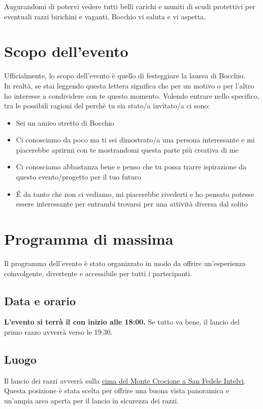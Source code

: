 \documentclass[12pt, a4paper]{article}
\begin{document}
Augurandomi di potervi vedere tutti belli carichi e muniti di scudi protettivi per eventuali razzi birichini e vaganti, Bocchio vi saluta e vi aspetta.


\clearpage
\newpage
\setlength{\parindent}{1em}
\setlength{\parskip}{1pt}


\section{Scopo dell'evento}

Ufficialmente, lo scopo dell'evento è quello di festeggiare la laurea di Bocchio. \\
In realtà, se stai leggendo questa lettera significa che per un motivo o per l'altro ho interesse a condividere con te questo momento.
Volendo entrare nello specifico, tra le possibili ragioni del perchè tu sia stato/a invitato/a ci sono:
\begin{itemize}
    \item Sei un amico stretto di Bocchio
    \item Ci conosciamo da poco ma ti sei dimostrato/a una persona interessante e mi piacerebbe aprirmi con te mostrandomi questa parte più creativa di me
    \item Ci conosciamo abbastanza bene e penso che tu possa trarre ispirazione da questo evento/progetto per il tuo futuro
    \item É da tanto che non ci vediamo, mi piacerebbe rivederti e ho pensato potesse essere interessante per entrambi trovarsi per una attività diversa dal solito
\end{itemize}


\section{Programma di massima}

Il programma dell'evento è stato organizzato in modo da offrire un'esperienza coinvolgente, divertente e accessibile per tutti i partecipanti.

\subsection*{Data e orario}
\textbf{L'evento si terrà il  con inizio alle 18:00.} Se tutto va bene, il lancio del primo razzo avverrà verso le 19:30.

\subsection*{Luogo}
Il lancio dei razzi avverrà sulla \href{https://goo.gl/maps/K2kVRpBknDxLTATeA}{cima del Monte Crocione a San Fedele Intelvi}.
Questa posizione è stata scelta per offrire una buona vista panoramica e un'ampia area aperta per il lancio in sicurezza dei razzi.
\end{document}
